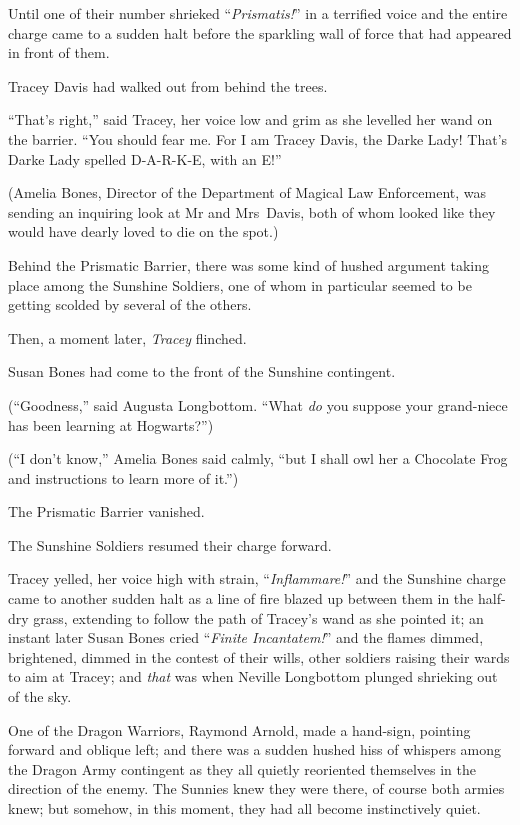 Until one of their number shrieked “\emph{Prismatis!}” in a terrified voice and the entire charge came to a sudden halt before the sparkling wall of force that had appeared in front of them.

Tracey Davis had walked out from behind the trees.

“That’s right,” said Tracey, her voice low and grim as she levelled her wand on the barrier. “You should fear me. For I am Tracey Davis, the Darke Lady! That’s Darke Lady spelled D-A-R-K-E, with an E!”

(Amelia Bones, Director of the Department of Magical Law Enforcement, was sending an inquiring look at Mr and Mrs~Davis, both of whom looked like they would have dearly loved to die on the spot.)

Behind the Prismatic Barrier, there was some kind of hushed argument taking place among the Sunshine Soldiers, one of whom in particular seemed to be getting scolded by several of the others.

Then, a moment later, \emph{Tracey} flinched.

Susan Bones had come to the front of the Sunshine contingent.

(“Goodness,” said Augusta Longbottom. “What \emph{do} you suppose your grand-niece has been learning at Hogwarts?”)

(“I don’t know,” Amelia Bones said calmly, “but I shall owl her a Chocolate Frog and instructions to learn more of it.”)

The Prismatic Barrier vanished.

The Sunshine Soldiers resumed their charge forward.

Tracey yelled, her voice high with strain, “\emph{Inflammare!}” and the Sunshine charge came to another sudden halt as a line of fire blazed up between them in the half-dry grass, extending to follow the path of Tracey’s wand as she pointed it; an instant later Susan Bones cried “\emph{Finite Incantatem!}” and the flames dimmed, brightened, dimmed in the contest of their wills, other soldiers raising their wards to aim at Tracey; and \emph{that} was when Neville Longbottom plunged shrieking out of the sky.

\later

One of the Dragon Warriors, Raymond Arnold, made a hand-sign, pointing forward and oblique left; and there was a sudden hushed hiss of whispers among the Dragon Army contingent as they all quietly reoriented themselves in the direction of the enemy. The Sunnies knew they were there, of course both armies knew; but somehow, in this moment, they had all become instinctively quiet.

